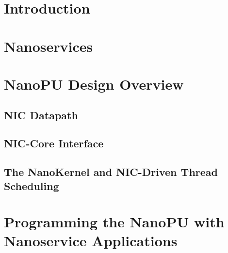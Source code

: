\section{Introduction}

\section{Nanoservices}


\section{NanoPU Design Overview}

\subsection{NIC Datapath}

\subsection{NIC-Core Interface}

\subsection{The NanoKernel and NIC-Driven Thread Scheduling}

\section{Programming the NanoPU with Nanoservice Applications}

